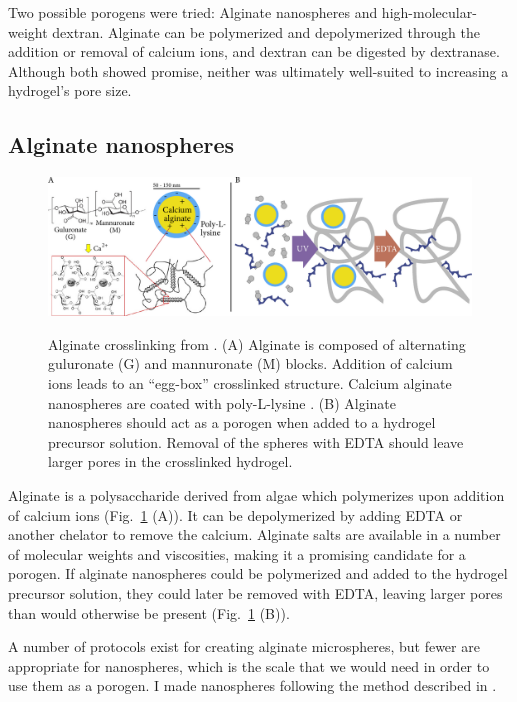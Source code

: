 Two possible porogens were tried: Alginate nanospheres and high-molecular-weight dextran.  Alginate can be polymerized and depolymerized through the addition or removal of calcium ions, and dextran can be digested by dextranase.  Although both showed promise, neither was ultimately well-suited to increasing a hydrogel's pore size.

\subsection{Alginate nanospheres}
\begin{figure}
\caption{Alginate crosslinking from \cite{bruchet15}.  (A) Alginate is composed of alternating guluronate (G) and mannuronate (M) blocks.  Addition of calcium ions leads to an ``egg-box'' crosslinked structure. Calcium alginate nanospheres are coated with poly-L-lysine \cite{de03}.  (B) Alginate nanospheres should act as a porogen when added to a hydrogel precursor solution.  Removal of the spheres with EDTA should leave larger pores in the crosslinked hydrogel.}
\centering
\includegraphics[width=\textwidth]{figs/ch03/alginate-cartoon2}
\label{fig:alginate}
\end{figure}

Alginate is a polysaccharide derived from algae which polymerizes upon addition of calcium ions (Fig.~\ref{fig:alginate} (A)).  It can be depolymerized by adding EDTA or another chelator to remove the calcium.  Alginate salts are available in a number of molecular weights and viscosities, making it a promising candidate for a porogen.  If alginate nanospheres could be polymerized and added to the hydrogel precursor solution, they could later be removed with EDTA, leaving larger pores than would otherwise be present (Fig.~\ref{fig:alginate} (B)).

A number of protocols exist for creating alginate microspheres, but fewer are appropriate for nanospheres, which is the scale that we would need in order to use them as a porogen.  I made nanospheres following the method described in \cite{de03}.

